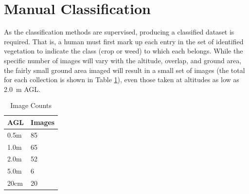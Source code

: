 \documentclass[letterpaper]{article}
\begin{document}
{%

\section{Manual Classification}
As the classification methods are supervised, producing a classified dataset is required. That is, a human must first mark up each entry in the set of identified vegetation to indicate the class (crop or weed) to which each belongs.  While the specific number of images will vary with the altitude, overlap, and ground area, the fairly small ground area imaged will result in a small set of images (the total for each collection is shown in Table \ref{tab:acquisition}), even those taken at altitudes as low as \SI{2.0}{\meter} AGL.

\begin{table}
	\def\arraystretch{0.70}
	\caption{Image Counts}
 	\label{tab:acquisition}
 	\begin{tabular}[t]{ll} 
		\textbf{AGL} & \textbf{Images} \\
		\midrule
		      0.5m & 85  \\
		      1.0m & 65  \\
		      2.0m & 52 \\
		      5.0m & 6  \\
		      20cm & 20 
	\end{tabular}
\end{table}


}
\end{document}
